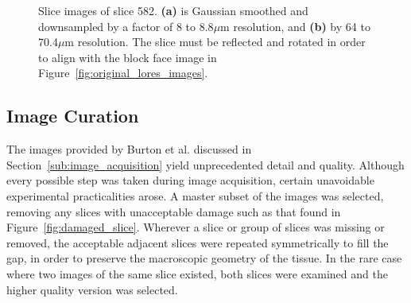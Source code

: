     \begin{figure}[htbp]
      \centering
      \caption{Slice images of slice 582. \textbf{(a)} is Gaussian smoothed and downsampled by a factor of 8 to 8.8$\mu$m resolution, and \textbf{(b)} by 64 to 70.4$\mu$m resolution. The slice must be reflected and rotated in order to align with the block face image in Figure~\ref{fig:original_lores_images}.}
      \label{fig:original_hires_images}
    \end{figure}
	

  \subsection{Image Curation} %
  \label{sub:image_curation}
    The images provided by Burton et al. \cite{Burton2006} discussed in Section~\ref{sub:image_acquisition} yield unprecedented detail and quality. Although every possible step was taken during image acquisition, certain unavoidable experimental practicalities arose. A master subset of the images was selected, removing any slices with unacceptable damage such as that found in Figure~\ref{fig:damaged_slice}. Wherever a slice or group of slices was missing or removed, the acceptable adjacent slices were repeated symmetrically to fill the gap, in order to preserve the macroscopic geometry of the tissue. In the rare case where two images of the same slice existed, both slices were examined and the higher quality version was selected.
    
